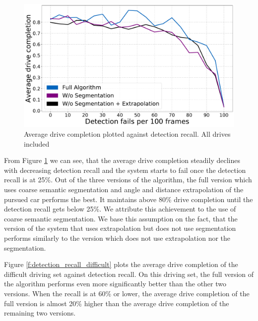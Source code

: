 \documentclass{ctuthesis/ctuthesis}
\begin{document}
\begin{figure}[]
    \centering
    \includegraphics[width=1\textwidth]{images/recall_chart7.pdf}
    
    \caption{Average drive completion plotted against detection recall. All drives included}\label{f:detection_recall}
\end{figure}

From Figure \ref{f:detection_recall} we can see, that the average drive completion steadily declines with decreasing detection recall and the system starts to fail once the detection recall is at 25\%. Out of the three versions of the algorithm, the full version which uses coarse semantic segmentation and angle and distance extrapolation of the pursued car performs the best. It maintains above 80\% drive completion until the detection recall gets below 25\%. We attribute this achievement to the use of coarse semantic segmentation. We base this assumption on the fact, that the version of the system that uses extrapolation but does not use segmentation performs similarly to the version which does not use extrapolation nor the segmentation. \par

Figure \ref{f:detection_recall_difficult} plots the average drive completion of the difficult driving set against detection recall. On this driving set, the full version of the algorithm performs even more significantly better than the other two versions. When the recall is at 60\% or lower, the average drive completion of the full version is almost 20\% higher than the average drive completion of the remaining two versions.
\end{document}
